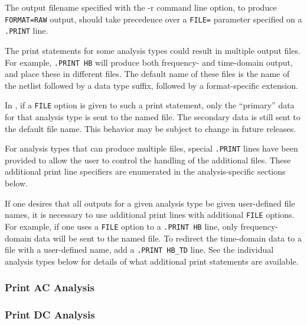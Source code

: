 \begin{Command}
\begin{XyceItemize}
\item The output filename specified with the -r command line option, 
  to produce {\tt FORMAT=RAW} output, should take precedence over 
  a {\tt FILE=} parameter specified on a {\tt .PRINT} line.

\item The print statements for some analysis types could result in multiple
  output files.  For example, \texttt{.PRINT HB} will produce both
  frequency- and time-domain output, and place these in different files.
  The default name of these files is the name of the netlist followed by
  a data type suffix, followed by a format-specific extension.

  In \Xyce{}, if a \texttt{FILE} option is given to such a print
  statement, only the ``primary'' data for that analysis type is sent to
  the named file.  The secondary data is still sent to the default file
  name.  This behavior may be subject to change in future releases.

  For analysis types that can produce multiple files,
  special \texttt{.PRINT} lines have been provided to allow the user to
  control the handling of the additional files.  These additional print
  line specifiers are enumerated in the analysis-specific sections
  below.

  If one desires that all outputs for a given analysis type be given
  user-defined file names, it is necessary to use additional print lines
  with additional \texttt{FILE} options.  For example, if one uses
  a \texttt{FILE} option to a \texttt{.PRINT HB} line, only
  frequency-domain data will be sent to the named file.  To redirect the
  time-domain data to a file with a user-defined name, add
  a \texttt{.PRINT HB\_TD} line.  See the individual analysis types
  below for details of what additional print statements are available.
\end{XyceItemize}

\end{Command}

\subsubsection{Print AC Analysis}


\subsubsection{Print DC Analysis}


